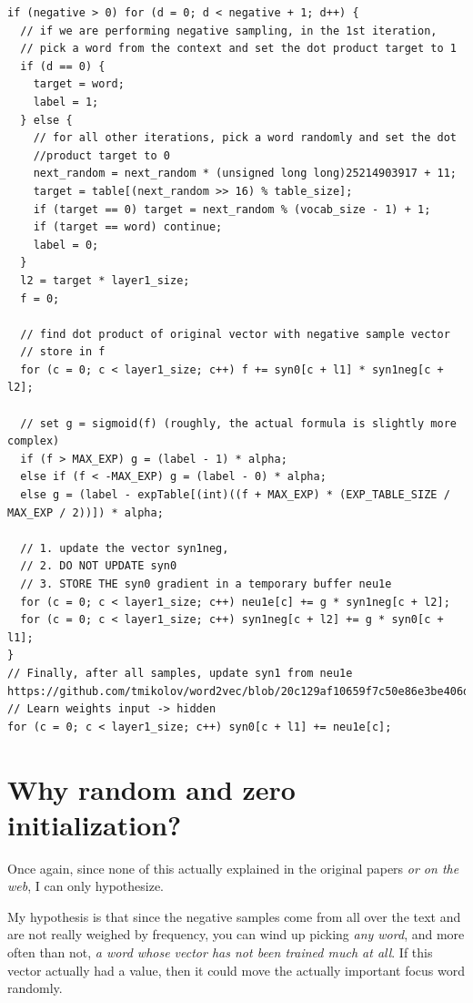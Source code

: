 \documentclass{book}
\begin{document}
\begin{verbatim}
if (negative > 0) for (d = 0; d < negative + 1; d++) {
  // if we are performing negative sampling, in the 1st iteration,
  // pick a word from the context and set the dot product target to 1
  if (d == 0) {
    target = word;
    label = 1;
  } else {
    // for all other iterations, pick a word randomly and set the dot
    //product target to 0
    next_random = next_random * (unsigned long long)25214903917 + 11;
    target = table[(next_random >> 16) % table_size];
    if (target == 0) target = next_random % (vocab_size - 1) + 1;
    if (target == word) continue;
    label = 0;
  }
  l2 = target * layer1_size;
  f = 0;

  // find dot product of original vector with negative sample vector
  // store in f
  for (c = 0; c < layer1_size; c++) f += syn0[c + l1] * syn1neg[c + l2];

  // set g = sigmoid(f) (roughly, the actual formula is slightly more complex)
  if (f > MAX_EXP) g = (label - 1) * alpha;
  else if (f < -MAX_EXP) g = (label - 0) * alpha;
  else g = (label - expTable[(int)((f + MAX_EXP) * (EXP_TABLE_SIZE / MAX_EXP / 2))]) * alpha;

  // 1. update the vector syn1neg,
  // 2. DO NOT UPDATE syn0
  // 3. STORE THE syn0 gradient in a temporary buffer neu1e
  for (c = 0; c < layer1_size; c++) neu1e[c] += g * syn1neg[c + l2];
  for (c = 0; c < layer1_size; c++) syn1neg[c + l2] += g * syn0[c + l1];
}
// Finally, after all samples, update syn1 from neu1e
https://github.com/tmikolov/word2vec/blob/20c129af10659f7c50e86e3be406df663beff438/word2vec.c#L541
// Learn weights input -> hidden
for (c = 0; c < layer1_size; c++) syn0[c + l1] += neu1e[c];
\end{verbatim}

\section{Why random and zero initialization?}

Once again, since none of this actually explained in the original papers
\emph{or on the web}, I can only hypothesize.

My hypothesis is that since the negative samples come from all over the text
and are not really weighed by frequency, you can wind up picking \emph{any word},
and more often than not, \emph{a word whose vector has not been trained much at all}.
If this vector actually had a value, then it could move the actually important
focus word randomly.
\end{document}
